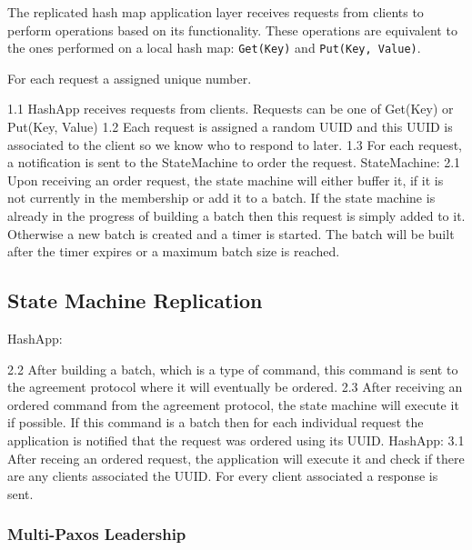 \documentclass[sigconf]{acmart}
\begin{document}
The replicated hash map application layer receives requests from clients to perform operations based on its functionality. These operations are equivalent to the ones performed on a local hash map: \texttt{Get(Key)} and \texttt{Put(Key, Value)}. 

For each request a assigned unique number.

1.1 HashApp receives requests from clients.
    Requests can be one of Get(Key) or Put(Key, Value)
1.2 Each request is assigned a random UUID and this UUID is associated to the client so we know who to respond to later.
1.3 For each request, a notification is sent to the StateMachine to order the request.
StateMachine:
2.1 Upon receiving an order request, the state machine will either buffer it, if it is not currently in the membership or add it to a batch.
    If the state machine is already in the progress of building a batch then this request is simply added to it.
    Otherwise a new batch is created and a timer is started. The batch will be built after the timer expires or a maximum batch size is reached.

\subsection{State Machine Replication}




HashApp:

2.2 After building a batch, which is a type of command, this command is sent to the agreement protocol where it will eventually be ordered.
2.3 After receiving an ordered command from the agreement protocol, the state machine will execute it if possible.
    If this command is a batch then for each individual request the application is notified that the request was ordered using its UUID.
HashApp:
3.1 After receing an ordered request, the application will execute it and check if there are any clients associated the UUID.
    For every client associated a response is sent.

\subsubsection{Multi-Paxos Leadership} %

\end{document}
